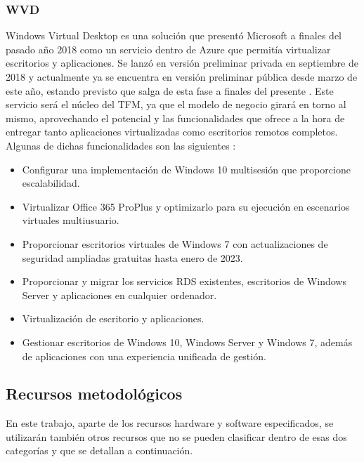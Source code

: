 \subsubsection{\acf{WVD}}
Windows Virtual Desktop es una solución que presentó Microsoft a finales del pasado año 2018 como un servicio dentro de Azure que permitía virtualizar escritorios y aplicaciones. Se lanzó en versión preliminar privada en septiembre de 2018 y actualmente ya se encuentra en versión preliminar pública desde marzo de este año, estando previsto que salga de esta fase a finales del presente \cite{juliawhitebradanderson2019}. Este servicio será el núcleo del \acs{TFM}, ya que el modelo de negocio girará en torno al mismo, aprovechando el potencial y las funcionalidades que ofrece a la hora de entregar tanto aplicaciones virtualizadas como escritorios remotos completos. Algunas de dichas funcionalidades son las siguientes \cite{microsoftwvd2019}:

\begin{itemize}
    \item Configurar una implementación de Windows 10 multisesión que proporcione escalabilidad.
    \item Virtualizar Office 365 ProPlus y optimizarlo para su ejecución en \mbox{escenarios} virtuales multiusuario.
    \item Proporcionar escritorios virtuales de Windows 7 con actualizaciones de seguridad ampliadas gratuitas hasta enero de 2023.
    
    \clearpage
    
    \item Proporcionar y migrar los servicios \acf{RDS} existentes, escritorios de Windows Server y aplicaciones en cualquier ordenador.
    \item Virtualización de escritorio y aplicaciones.
    \item Gestionar escritorios de Windows 10, Windows Server y Windows 7, además de aplicaciones con una experiencia unificada de gestión.
\end{itemize}

\subsection{Recursos metodológicos}
En este trabajo, aparte de los recursos hardware y software especificados, se utilizarán también otros recursos que no se pueden clasificar dentro de esas dos categorías y que se detallan a continuación.

